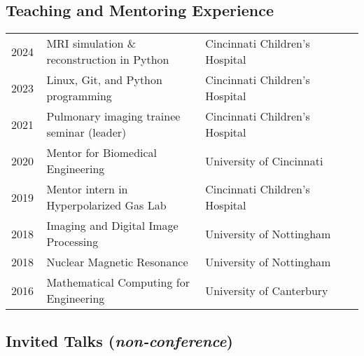 \documentclass[12pt,]{scrartcl}
\begin{document}
\subsection{Teaching and Mentoring Experience}\label{teaching}

\begin{table}[!h]
{\def\arraystretch{1.5}\tabcolsep=0pt
\begin{tabular}{p{0.10\linewidth}p{0.45\linewidth}p{0.45\linewidth}}

2024 & MRI simulation \& reconstruction in Python & Cincinnati Children's Hospital \\

2023 & Linux, Git, and Python programming & Cincinnati Children's Hospital \\

2021 & Pulmonary imaging trainee seminar (leader) & Cincinnati Children's Hospital\\

2020 & Mentor for Biomedical Engineering & University of Cincinnati\\

 2019 & Mentor intern in Hyperpolarized Gas Lab & Cincinnati Children's Hospital\\
  
  2018 & Imaging and Digital Image Processing & University of Nottingham \\
  
  2018 & Nuclear Magnetic Resonance & University of Nottingham  \\

 2016 & Mathematical Computing for Engineering & University of Canterbury  \\
  
\end{tabular}%
}
\end{table}

\subsection{Invited Talks (\textit{non-conference})}\label{presentations-and-talks}
\end{document}
